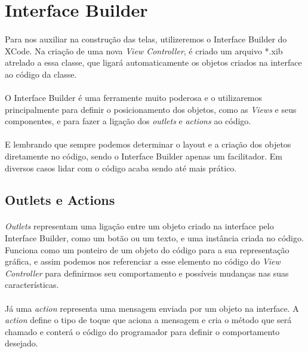 \documentclass[a4paper,12pt,brazil,doubleside]{book}
\begin{document}
\bigskip
\bigskip


\section{Interface Builder}

\paragraph{}Para nos auxiliar na construção das telas, utilizeremos o Interface Builder do XCode. Na criação de uma nova \emph{View Controller}, é criado um arquivo *.xib atrelado a essa classe, que ligará automaticamente os objetos criados na interface ao código da classe.
\paragraph{}O Interface Builder é uma ferramente muito poderosa e o utilizaremos principalmente para definir o posicionamento dos objetos, como as \emph{Views} e seus componentes, e para fazer a ligação dos \emph{outlets} e \emph{actions} ao código.
\paragraph{}E lembrando que sempre podemos determinar o layout e a criação dos objetos diretamente no código, sendo o Interface Builder apenas um facilitador. Em diversos casos lidar com o código acaba sendo até mais prático.

\bigskip

\subsection{Outlets e Actions}

\paragraph{}\emph{Outlets} representam uma ligação entre um objeto criado na interface pelo Interface Builder, como um botão ou um texto, e uma instância criada no código. Funciona como um ponteiro de um objeto do código para a sua representação gráfica, e assim podemos nos referenciar a esse elemento no código do \emph{View Controller} para definirmos seu comportamento e possíveis mudanças nas suas características.
\paragraph{}Já uma \emph{action} representa uma mensagem enviada por um objeto na interface. A \emph{action} define o tipo de toque que aciona a mensagem e cria o método que será chamado e conterá o código do programador para definir o comportamento desejado.
\end{document}
